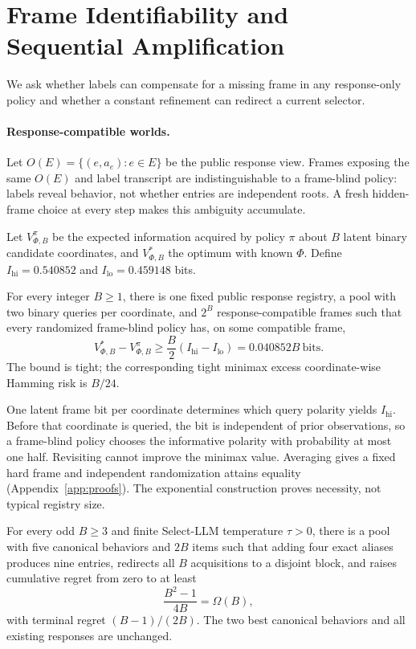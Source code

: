 \section{Frame Identifiability and Sequential Amplification}
\label{sec:theory}

We ask whether labels can compensate for a missing frame in any response-only policy and whether a constant refinement can redirect a current selector.

\paragraph{Response-compatible worlds.}
Let $O(E)=\{(e,a_e):e\in E\}$ be the public response view. Frames exposing the same $O(E)$ and label transcript are indistinguishable to a frame-blind policy: labels reveal behavior, not whether entries are independent roots. A fresh hidden-frame choice at every step makes this ambiguity accumulate.

Let $V^\pi_{\Phi,B}$ be the expected information acquired by policy $\pi$ about $B$ latent binary candidate coordinates, and $V^*_{\Phi,B}$ the optimum with known $\Phi$. Define $I_{\mathrm{hi}}=0.540852$ and $I_{\mathrm{lo}}=0.459148$ bits.

\begin{theorem}
\label{thm:sequential}
For every integer $B\geq1$, there is one fixed public response registry, a pool with two binary queries per coordinate, and $2^B$ response-compatible frames such that every randomized frame-blind policy has, on some compatible frame,
\[
V^*_{\Phi,B}-V^\pi_{\Phi,B}
\geq \frac{B}{2}(I_{\mathrm{hi}}-I_{\mathrm{lo}})
=0.040852B\ \text{bits}.
\]
The bound is tight; the corresponding tight minimax excess coordinate-wise Hamming risk is $B/24$.
\end{theorem}

One latent frame bit per coordinate determines which query polarity yields $I_{\mathrm{hi}}$. Before that coordinate is queried, the bit is independent of prior observations, so a frame-blind policy chooses the informative polarity with probability at most one half. Revisiting cannot improve the minimax value. Averaging gives a fixed hard frame and independent randomization attains equality (Appendix~\ref{app:proofs}). The exponential construction proves necessity, not typical registry size.

\begin{theorem}
\label{thm:amplification}
For every odd $B\geq3$ and finite Select-LLM temperature $\tau>0$, there is a pool with five canonical behaviors and $2B$ items such that adding four exact aliases produces nine entries, redirects all $B$ acquisitions to a disjoint block, and raises cumulative regret from zero to at least
\[
\frac{B^2-1}{4B}=\Omega(B),
\]
with terminal regret $(B-1)/(2B)$. The two best canonical behaviors and all existing responses are unchanged.
\end{theorem}

